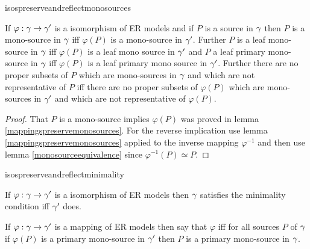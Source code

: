 isospreserveandreflectmonosources
\begin{lemma}
\label{isospreserveandreflectmonosources}
If $\varphi: \gamma \rightarrow \gamma'$ is a isomorphism of ER models and
if $P$ is a source in $\gamma$ then 
$P$ is a mono-source in $\gamma$ iff  $\varphi(P)$ is a mono-source in $\gamma'$. 
Further  $P$ is a leaf mono-source in $\gamma$ iff $\varphi(P)$ is a leaf mono source in $\gamma'$ and $P$ a leaf primary mono-source in $\gamma$ iff $\varphi(P)$ is a leaf primary mono source in $\gamma'$.
Further there are no proper subsets of $P$ which are mono-sources in $\gamma$ and which are not representative of $P$
iff there are no proper subsets of $\varphi(P)$ which are mono-sources in $\gamma'$ and which are not representative of $\varphi(P)$.
\end{lemma}
\begin{proof}
That $P$ is a mono-source implies $\varphi(P)$ was proved
in lemma \ref{mappingspreservemonosources}. For the reverse implication use 
lemma \ref{mappingspreservemonosources} applied to the inverse mapping $\varphi^{-1}$
and then use lemma \ref{monosourceequivalence} since $\varphi^{-1}(P) \simeq P$.
\end{proof}

isospreserveandreflectminimality
\begin{corollary}
\label{isospreserveandreflectminimality}
If $\varphi: \gamma \rightarrow \gamma'$ is a isomorphism of ER models then $\gamma$ satisfies the minimality condition iff $\gamma'$ does.
\end{corollary}

\begin{definition}
If $\varphi: \gamma \rightarrow \gamma'$ is a mapping of ER models then
say that $\varphi$  
iff for all sources $P$ of  $\gamma$ if
$\varphi(P)$ is a primary mono-source in $\gamma'$ then $P$ is a primary mono-source in $\gamma$.
\end{definition}

